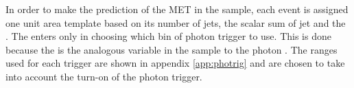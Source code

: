 In order to make the prediction of the MET in the \Z sample, each \Z event is assigned one unit 
area template based on its number of jets, the scalar sum of jet \pt and the \Z \pt. 
The \Z \pt enters only in choosing which bin of photon trigger to use. 
This is done because the \Z \pt is the analogous variable in the \Z sample 
to the photon \pt. The \Z \pt ranges used for each trigger are shown in appendix \ref{app:photrig}
and are chosen to take into account the turn-on of the photon trigger.







